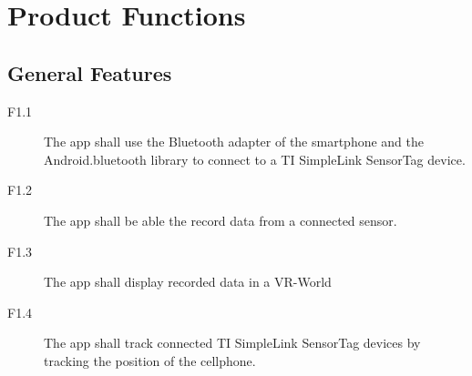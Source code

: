 \section{Product Functions}


\subsection{General Features}
\begin{description}
  \item[F1.1] The app shall use the Bluetooth adapter of the smartphone and the Android.bluetooth library to connect to a TI SimpleLink SensorTag device.
  \item[F1.2] The app shall be able the record data from a connected sensor.
  \item[F1.3] The app shall display recorded data in a VR-World
  \item[F1.4] The app shall track connected TI SimpleLink SensorTag devices by tracking the position of the cellphone.
\end{description}

